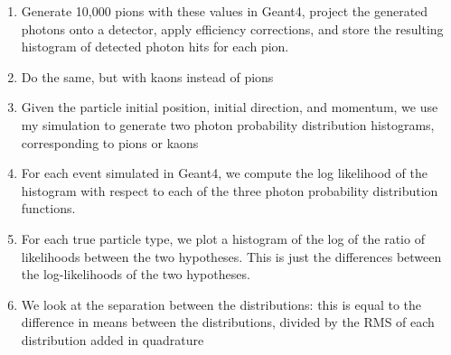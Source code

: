 \begin{enumerate}
\item Generate 10,000 pions with these values in Geant4, project the generated photons onto a detector, apply efficiency corrections, and store the resulting histogram of detected photon hits for each pion. 
\item Do the same, but with kaons instead of pions
\item Given the particle initial position, initial direction, and momentum, we use my simulation to generate two photon probability distribution histograms, corresponding to pions or kaons
\item For each event simulated in Geant4, we compute the log likelihood of the histogram with respect to each of the three photon probability distribution functions.
\item For each true particle type, we plot a histogram of the log of the ratio of likelihoods between the two hypotheses.
This is just the differences between the log-likelihoods of the two hypotheses.
\item We look at the separation between the distributions: this is equal to the difference in means between the distributions, divided by the RMS of each distribution added in quadrature
\end{enumerate}

